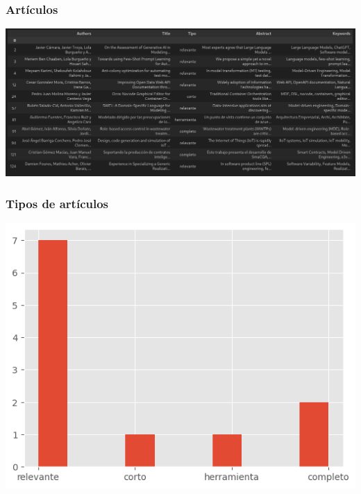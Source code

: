 \begin{frame}
  \frametitle{Artículos}
  \includegraphics[width=\textwidth]{img/resumen}
\end{frame}

\begin{frame}
  \frametitle{Tipos de artículos}
  \centering\includegraphics[height=.9\textheight]{img/histograma-tipos}
\end{frame}

